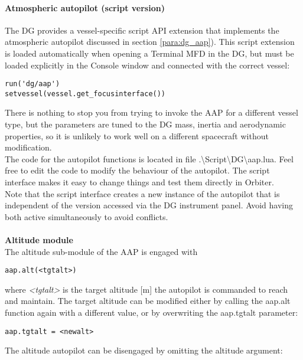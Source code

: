 \documentclass[Orbiter User Manual.tex]{subfiles}
\begin{document}
\paragraph{Atmospheric autopilot (script version)}
The DG provides a vessel-specific script API extension that implements the atmospheric autopilot discussed in section \ref{para:dg_aap}). This script extension is loaded automatically when opening a Terminal MFD in the DG, but must be loaded explicitly in the Console window and connected with the correct vessel:

\begin{lstlisting}[language=OSFS]
run('dg/aap')
setvessel(vessel.get_focusinterface())
\end{lstlisting}

\noindent
There is nothing to stop you from trying to invoke the AAP for a different vessel type, but the parameters are tuned to the DG mass, inertia and aerodynamic properties, so it is unlikely to work well on a different spacecraft without modification.\\
The code for the autopilot functions is located in file .\textbackslash Script\textbackslash DG\textbackslash aap.lua. Feel free to edit the code to modify the behaviour of the autopilot. The script interface makes it easy to change things and test them directly in Orbiter.\\
Note that the script interface creates a new instance of the autopilot that is independent of the version accessed via the DG instrument panel. Avoid having both active simultaneously to avoid conflicts.\\
\\
\textbf{Altitude module}\\
The altitude sub-module of the AAP is engaged with

\begin{lstlisting}[language=OSFS]
aap.alt(<tgtalt>)
\end{lstlisting}

\noindent
where \textit{<tgtalt>} is the target altitude [m] the autopilot is commanded to reach and maintain. The target altitude can be modified either by calling the aap.alt function again with a different value, or by overwriting the aap.tgtalt parameter:

\begin{lstlisting}[language=OSFS]
aap.tgtalt = <newalt>
\end{lstlisting}

\noindent
The altitude autopilot can be disengaged by omitting the altitude argument:
\end{document}
